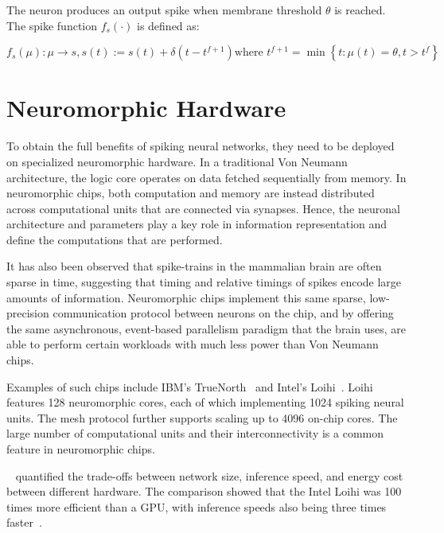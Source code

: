 \documentclass[fyp]{socreport}
\begin{document}
The neuron produces an output spike when membrane threshold $\theta$ is
reached. The spike function $f_{s}(\cdot)$ is defined as:

\begin{equation}
  \label{eq:slayer_spike_fn}
  f_{s}(\mu) : \mu \rightarrow s, s(t) := s(t) + \delta(t - t^{f+1}) \text{
    where } t^{f+1} = \min \left\{t: \mu(t) = \theta, t > t^{f}\right\}
\end{equation}

\section{Neuromorphic Hardware\label{neuromorphic}}

To obtain the full benefits of spiking neural networks, they need to be deployed
on specialized neuromorphic hardware. In a traditional Von Neumann architecture,
the logic core operates on data fetched sequentially from memory. In
neuromorphic chips, both computation and memory are instead distributed across
computational units that are connected via synapses. Hence, the neuronal
architecture and parameters play a key role in information representation and
define the computations that are performed.

It has also been observed that spike-trains in the mammalian brain are often
sparse in time, suggesting that timing and relative timings of spikes encode
large amounts of information. Neuromorphic chips implement this same sparse,
low-precision communication protocol between neurons on the chip, and by
offering the same asynchronous, event-based parallelism paradigm that the brain
uses, are able to perform certain workloads with much less power than Von
Neumann chips.

Examples of such chips include IBM's TrueNorth~\cite{Merolla668} and Intel's
Loihi~\cite{davies2018loihi}. Loihi features 128 neuromorphic cores, each of
which implementing 1024 spiking neural units. The mesh protocol further supports
scaling up to 4096 on-chip cores. The large number of computational units and
their interconnectivity is a common feature in neuromorphic chips.

~\citeauthor{blouw18_bench_keywor_spott_effic_neurom_hardw} quantified the
trade-offs between network size, inference speed, and energy cost between
different hardware. The comparison showed that the Intel Loihi was 100 times
more efficient than a GPU, with inference speeds also being three times
faster~\cite{blouw18_bench_keywor_spott_effic_neurom_hardw}.
\end{document}
